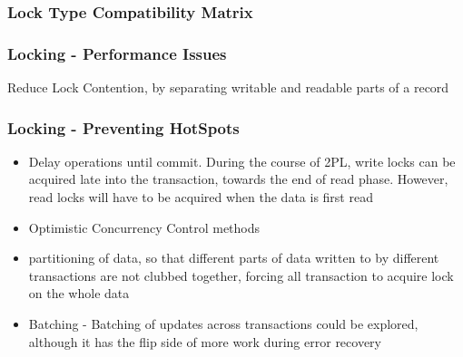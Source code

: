 \documentclass[12]{beamer}
\begin{document}
\begin{frame}
  \frametitle{Lock Type Compatibility Matrix}
  \begin{center}
  \end{center}
\end{frame}

\begin{frame}
	\frametitle{Locking - Performance Issues}
  Reduce Lock Contention, by separating writable and readable parts of a record
\end{frame}

\begin{frame}
\frametitle{Locking - Preventing HotSpots}
\begin{itemize}
\item Delay operations until commit. During the course of 2PL, write locks can be acquired late into the transaction, towards the end of read phase. However, read locks will have to be acquired when the data is first read
\item Optimistic Concurrency Control methods
\item partitioning of data, so that different parts of data written to by different transactions are not clubbed together, forcing all transaction to acquire lock on the whole data
\item Batching - Batching of updates across transactions could be explored, although it has the flip side of more work during error recovery
\end{itemize}
\end{frame}
\end{document}
